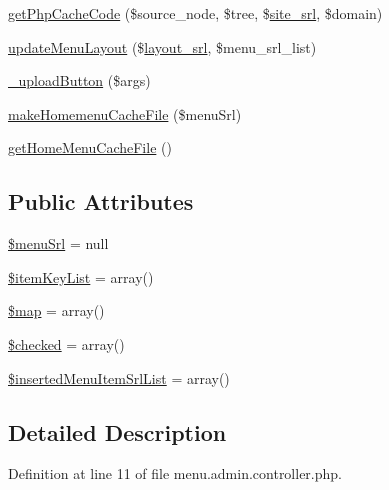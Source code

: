 \begin{DoxyCompactItemize}
\item 
\hyperlink{classmenuAdminController_a8c2db506b41da362dcf6b653df7aa0ee}{get\-Php\-Cache\-Code} (\$source\-\_\-node, \$tree, \$\hyperlink{ko_8install_8php_a8b1406b4ad1048041558dce6bfe89004}{site\-\_\-srl}, \$domain)
\item 
\hyperlink{classmenuAdminController_a2f19737cbd03a3027664eb559af4776e}{update\-Menu\-Layout} (\$\hyperlink{ko_8install_8php_a70054876db09b2519a1726663c8dd9e7}{layout\-\_\-srl}, \$menu\-\_\-srl\-\_\-list)
\item 
\hyperlink{classmenuAdminController_a7581ba4f8611f797b1687af4a5473be0}{\-\_\-upload\-Button} (\$args)
\item 
\hyperlink{classmenuAdminController_a14bb1d222613177761419783e99b9c30}{make\-Homemenu\-Cache\-File} (\$menu\-Srl)
\item 
\hyperlink{classmenuAdminController_a1aac19bba8c7abfc8a284b1d3c8b4424}{get\-Home\-Menu\-Cache\-File} ()
\end{DoxyCompactItemize}
\subsection*{Public Attributes}
\begin{DoxyCompactItemize}
\item 
\hyperlink{classmenuAdminController_a13934ce3c67b5b27f0d35704e98cc033}{\$menu\-Srl} = null
\item 
\hyperlink{classmenuAdminController_a776db5a961d918ad97f1c6ce7b34fc07}{\$item\-Key\-List} = array()
\item 
\hyperlink{classmenuAdminController_a9f7e4b726de0df35fa25694c702f88f8}{\$map} = array()
\item 
\hyperlink{classmenuAdminController_a37ff2e21ee9beb6c2b762bb36b7e4d69}{\$checked} = array()
\item 
\hyperlink{classmenuAdminController_a4b64a6e1711227dce12e508d4eb3c861}{\$inserted\-Menu\-Item\-Srl\-List} = array()
\end{DoxyCompactItemize}


\subsection{Detailed Description}


Definition at line 11 of file menu.\-admin.\-controller.\-php.



